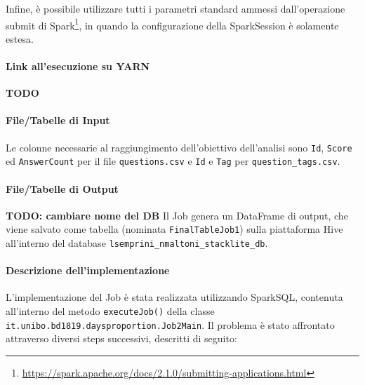   Infine, è possibile utilizzare tutti i parametri standard ammessi dall'operazione submit di Spark\footnote{\url{https://spark.apache.org/docs/2.1.0/submitting-applications.html}},
  in quando la configurazione della SparkSession è solamente estesa.

  \paragraph{Link all'esecuzione su YARN}\label{par:job2:spark:yarn}

  \textbf{TODO}

  \paragraph{File/Tabelle di Input}\label{par:job2:spark:input}

  Le colonne necessarie al raggiungimento dell'obiettivo dell'analisi sono \texttt{Id}, \texttt{Score}
  ed \texttt{AnswerCount} per il file \texttt{questions.csv} e \texttt{Id} e \texttt{Tag} per \texttt{question\_tags.csv}.

  \paragraph{File/Tabelle di Output}\label{par:job2:spark:output}
\textbf{TODO: cambiare nome del DB}
  Il Job genera un DataFrame di output, che viene salvato come tabella (nominata \texttt{FinalTableJob1})
  sulla piattaforma Hive all'interno del database \texttt{lsemprini\_nmaltoni\_stacklite\_db}.


  \paragraph{Descrizione dell'implementazione}\label{par:job2:spark:implementation}

  L'implementazione del Job è stata realizzata utilizzando SparkSQL, contenuta all'interno del metodo \texttt{executeJob()}
  della classe \texttt{it.unibo.bd1819.daysproportion.Job2Main}.
  Il problema è stato affrontato attraverso diversi steps successivi, descritti di seguito:

